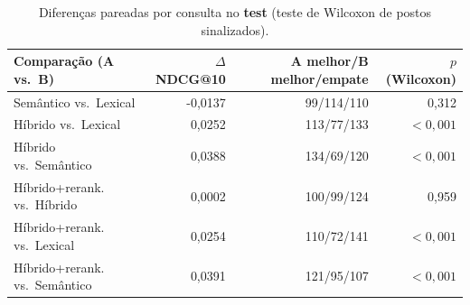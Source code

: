 \begin{table}[t]
\centering
\caption{Diferenças pareadas por consulta no \textbf{test} (teste de Wilcoxon de postos sinalizados).}
\label{tab:sig}
\small
\begin{tabular}{lrrr}
\toprule
Comparação (A vs.\ B) & $\Delta$ NDCG@10 & A melhor/B melhor/empate & $p$ (Wilcoxon) \\
\midrule
Semântico vs.\ Lexical & -0,0137 & 99/114/110 & 0,312 \\
Híbrido vs.\ Lexical & 0,0252 & 113/77/133 & $<0{,}001$ \\
Híbrido vs.\ Semântico & 0,0388 & 134/69/120 & $<0{,}001$ \\
Híbrido+rerank. vs.\ Híbrido & 0,0002 & 100/99/124 & 0,959 \\
Híbrido+rerank. vs.\ Lexical & 0,0254 & 110/72/141 & $<0{,}001$ \\
Híbrido+rerank. vs.\ Semântico & 0,0391 & 121/95/107 & $<0{,}001$ \\
\bottomrule
\end{tabular}
\end{table}
